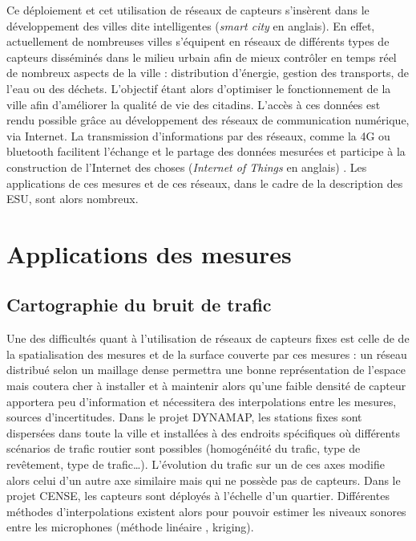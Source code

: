 Ce déploiement et cet utilisation de réseaux de capteurs s'insèrent dans le développement des villes dite intelligentes (\textit{smart city} en anglais). En effet, actuellement de nombreuses villes s'équipent en réseaux de différents types de capteurs disséminés dans le milieu urbain afin de mieux contrôler en temps réel de nombreux aspects de la ville : distribution d'énergie, gestion des transports, de l’eau ou des déchets. L'objectif étant alors d'optimiser le fonctionnement de la ville afin d'améliorer la qualité de vie des citadins. L'accès à ces données est rendu possible grâce au développement des réseaux de communication numérique, via Internet. La transmission d'informations par des réseaux, comme la 4G ou bluetooth facilitent l'échange et le partage des données mesurées et participe à la construction de l'Internet des choses (\textit{Internet of Things} en anglais) \cite{zanella2014internet}. Les applications de ces mesures et de ces réseaux, dans le cadre de la description des ESU, sont alors nombreux. 

\section{Applications des mesures}

\subsection{Cartographie du bruit de trafic}

Une des difficultés quant à l'utilisation de réseaux de capteurs fixes est celle de de la spatialisation des mesures et de la surface couverte par ces mesures : un réseau distribué selon un maillage dense permettra une bonne représentation de l'espace mais coutera cher à installer et à maintenir alors qu'une faible densité de capteur apportera peu d'information et nécessitera des interpolations entre les mesures, sources d'incertitudes. Dans le projet DYNAMAP, les stations fixes sont dispersées dans toute la ville et installées à des endroits spécifiques où différents scénarios de trafic routier sont possibles (homogénéité du trafic, type de revêtement, type de trafic\dots). L'évolution du trafic sur un de ces axes modifie alors celui d'un autre axe similaire mais qui ne possède pas de capteurs. Dans le projet CENSE, les capteurs sont déployés à l'échelle d'un quartier. Différentes méthodes d'interpolations existent alors pour pouvoir estimer les niveaux sonores entre les microphones (méthode linéaire , kriging). \\


